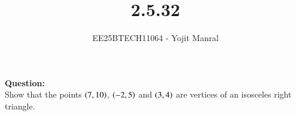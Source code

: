 \documentclass[journal]{IEEEtran}
\begin{document}

\vspace{3cm}

\title{2.5.32}
\author{EE25BTECH11064 - Yojit Manral}

\maketitle
{\let\newpage\relax\maketitle}
\renewcommand{\thefigure}{\theenumi}
\renewcommand{\thetable}{\theenumi}
\setlength{\intextsep}{10pt} %

\textbf{Question:}\\
Show that the points $\left(7,10\right)$, $\left(-2,5\right)$ and $\left(3,4\right)$ are vertices of an isosceles right triangle.
\end{document}
